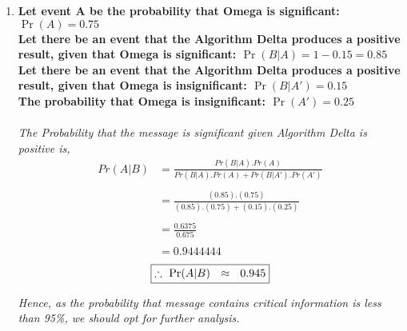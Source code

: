 \documentclass{article}
\begin{document}
\begin{enumerate}
\item
  \textbf{Let event A be the probability that Omega is significant: $\Pr(A) = 0.75$}\\
  \textbf{Let there be an event that the Algorithm Delta produces a positive result, given that Omega is significant: $\Pr(B|A) = 1-0.15 = 0.85$}\\
  \textbf{Let there be an event that the Algorithm Delta produces a positive result, given that Omega is insignificant: $\Pr(B|A') = 0.15$}\\
  \textbf{The probability that Omega is insignificant: $\Pr(A') = 0.25$}\\\\
  \textit{The Probability that the message is significant given Algorithm Delta is positive is,}
  \begin{align*}
    Pr(A|B) &= \frac{Pr(B|A).Pr(A)}{Pr(B|A).Pr(A) + Pr(B|A').Pr(A')}\\\\
    &= \frac{(0.85). (0.75)}{(0.85). (0.75) + (0.15). (0.25)}\\\\
    &= \frac{0.6375}{0.675}\\\\
    &= 0.9444444
  \end{align*}
  \[
     \boxed{\therefore\ \Pr(A|B )\ \ \approx \ \ 0.945}\\
  \]

  \textit{Hence, as the probability that message contains critical information is less than 95\%, we should opt for further analysis.}\\\\


\end{enumerate}
\end{document}
